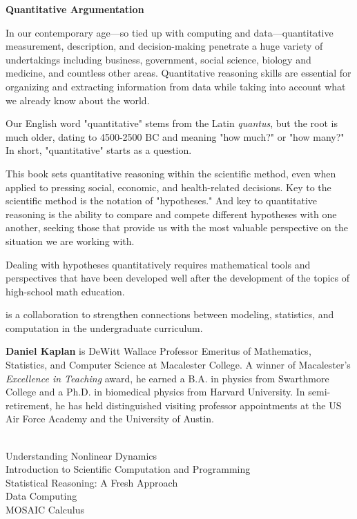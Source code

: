 {\large\bf Quantitative Argumentation} 

\medskip

In our contemporary age---so tied up with computing and data---quantitative measurement, 
description, and decision-making penetrate a huge variety of 
undertakings including business, government, social science, biology and medicine, 
and countless other areas. Quantitative reasoning skills are essential for organizing and extracting
information from data while taking into account what we already know about the world.

\medskip

Our English word "quantitative" stems from the Latin {\em quantus}, but the root is much 
older, dating to 4500-2500 BC and meaning "how much?" or "how many?" 
In short, "quantitative" starts as a question. 

\medskip

This book sets quantitative reasoning within the scientific method, even when applied to pressing
social, economic, and health-related decisions. Key to the scientific 
method is the notation of "hypotheses."
And key to quantitative reasoning is the ability to compare and compete different hypotheses
with one another, seeking those that provide us with the most valuable perspective on the situation
we are working with.

\medskip

Dealing with hypotheses quantitatively requires mathematical tools and perspectives that have 
been developed well after the development of the topics of high-school math education. 



\medskip

 is a collaboration to strengthen connections between modeling, statistics, and computation in the undergraduate curriculum.
\medskip




\bigskip

{\bf Daniel Kaplan} is  DeWitt Wallace Professor Emeritus of Mathematics, Statistics, and Computer Science at Macalester College. A winner of Macalester's {\em Excellence in Teaching} award, he earned a B.A. in physics from Swarthmore College and a Ph.D. in biomedical physics from Harvard University.
In semi-retirement, he has held distinguished visiting professor appointments at the US Air Force Academy and the University of Austin.

\\
Understanding Nonlinear Dynamics\\
Introduction to Scientific Computation and Programming\\
Statistical Reasoning: A Fresh Approach\\
Data Computing\\
MOSAIC Calculus

